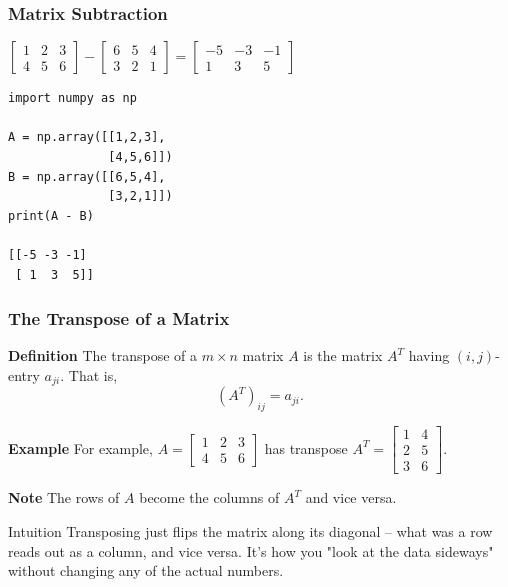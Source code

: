   \begin{frame}[fragile]\frametitle{Matrix Subtraction}
 
 $\begin{bmatrix}1 & 2 & 3 \\4 & 5 & 6\end{bmatrix}- \begin{bmatrix}6 & 5 & 4 \\3 & 2 & 1\end{bmatrix} = \begin{bmatrix}-5 & -3 & -1 \\1 & 3 & 5\end{bmatrix}$
\begin{lstlisting}
import numpy as np

A = np.array([[1,2,3],
              [4,5,6]])
B = np.array([[6,5,4],
              [3,2,1]])
print(A - B)

[[-5 -3 -1]
 [ 1  3  5]]
\end{lstlisting}

\end{frame}


\begin{frame}[fragile]\frametitle{The Transpose of a Matrix}
\textbf{Definition}
The transpose of a $m\times n$ matrix $A$ is the matrix $A^{T}$ 
having $(i,j)$-entry $a_{ji}$.  That is,
$$(A^{T})_{i j} = a_{j i}.$$



\textbf{Example}
For example, 
$ A = \left[ \begin{array}{rrr}
      1 & 2 & 3 \\
      4 & 5 & 6
     \end{array}\right]$
has transpose  
$A^T = \left[\begin{array}{rrr}
        1 & 4 \\ 
        2 & 5 \\
        3 & 6
       \end{array}\right]$.



\textbf{Note}
The rows of $A$ become the columns of $A^T$ and vice versa.

\begin{block}{Intuition}
Transposing just flips the matrix along its diagonal -- what was a row reads out as a column, and vice versa. It's how you "look at the data sideways" without changing any of the actual numbers.
\end{block}

\end{frame}


